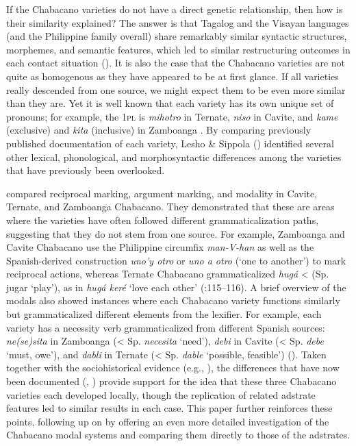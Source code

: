 \documentclass[output=paper,colorlinks,citecolor=brown]{langscibook}
\begin{document}
If the Chabacano varieties do not have a direct genetic relationship, then how is their similarity explained? The answer is that Tagalog and the Visayan languages (and the Philippine family overall) share remarkably similar syntactic structures, morphemes, and semantic features, which led to similar restructuring outcomes in each contact situation (\citealt{SippolaLesho2020}). It is also the case that the Chabacano varieties are not quite as homogenous as they have appeared to be at first glance. If all varieties really descended from one source, we might expect them to be even more similar than they are. Yet it is well known that each variety has its own unique set of pronouns; for example, the 1\textsc{pl} is \textit{mihotro} in Ternate, \textit{niso} in Cavite, and \textit{kame} (exclusive) and \textit{kita} (inclusive) in Zamboanga \parencites[14]{LeshoSippola2014}[457]{Lipski2013}. By comparing previously published documentation of each variety, Lesho \& Sippola (\citeyear[9--16]{LeshoSippola2014}) identified several other lexical, phonological, and morphosyntactic differences among the varieties that have previously been overlooked. 

\citet{SippolaLesho2020} compared reciprocal marking, argument marking, and modality in Cavite, Ternate, and Zamboanga Chabacano. They demonstrated that these are areas where the varieties have often followed different grammaticalization paths, suggesting that they do not stem from one source. For example, Zamboanga and Cavite Chabacano use the Philippine circumfix \textit{man-V-han} as well as the Spanish-derived construction \textit{uno'y otro} or \textit{uno a otro} (‘one to another') to mark reciprocal actions, whereas Ternate Chabacano grammaticalized \textit{hugá} < (Sp. jugar ‘play'), as in \textit{hugá keré} ‘love each other' (\citealt{SippolaLesho2020}:115–116). A brief overview of the modals also showed instances where each Chabacano variety functions similarly but grammaticalized different elements from the lexifier. For example, each variety has a necessity verb grammaticalized from different Spanish sources: \textit{ne(se)sita} in Zamboanga (< Sp. \textit{necesita} ‘need'), \textit{debi} in Cavite (< Sp. \textit{debe} ‘must, owe'), and \textit{dabli} in Ternate (< Sp. \textit{dable} ‘possible, feasible') (\citealt[112--113]{SippolaLesho2020}). Taken together with the sociohistorical evidence (e.g., \citealt{FernándezSippola2017}), the differences that have now been documented (\citealt{LeshoSippola2014}, \citealt{SippolaLesho2020}) provide support for the idea that these three Chabacano varieties each developed locally, though the replication of related adstrate features led to similar results in each case. This paper further reinforces these points, following up on \citet{SippolaLesho2020} by offering an even more detailed investigation of the Chabacano modal systems and comparing them directly to those of the adstrates.
\end{document}

